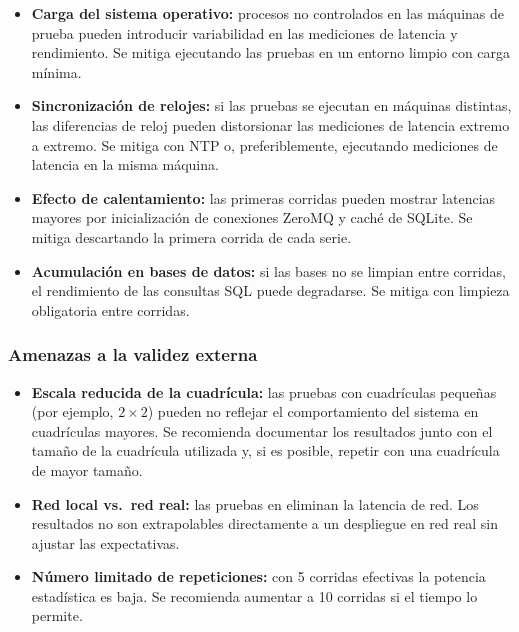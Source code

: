 \documentclass[12pt, a4paper]{article}
\let\oldtexttt\texttt
\renewcommand{\texttt}[1]{\oldtexttt{\seqsplit{#1}}}
\begin{document}
\begin{itemize}
    \item \textbf{Carga del sistema operativo:} procesos no controlados en las máquinas de prueba pueden introducir variabilidad en las mediciones de latencia y rendimiento. Se mitiga ejecutando las pruebas en un entorno limpio con carga mínima.
    \item \textbf{Sincronización de relojes:} si las pruebas se ejecutan en máquinas distintas, las diferencias de reloj pueden distorsionar las mediciones de latencia extremo a extremo. Se mitiga con NTP o, preferiblemente, ejecutando mediciones de latencia en la misma máquina.
    \item \textbf{Efecto de calentamiento:} las primeras corridas pueden mostrar latencias mayores por inicialización de conexiones ZeroMQ y caché de SQLite. Se mitiga descartando la primera corrida de cada serie.
    \item \textbf{Acumulación en bases de datos:} si las bases no se limpian entre corridas, el rendimiento de las consultas SQL puede degradarse. Se mitiga con limpieza obligatoria entre corridas.
\end{itemize}

\subsubsection{Amenazas a la validez externa}

\begin{itemize}
    \item \textbf{Escala reducida de la cuadrícula:} las pruebas con cuadrículas pequeñas (por ejemplo, $2\!\times\!2$) pueden no reflejar el comportamiento del sistema en cuadrículas mayores. Se recomienda documentar los resultados junto con el tamaño de la cuadrícula utilizada y, si es posible, repetir con una cuadrícula de mayor tamaño.
    \item \textbf{Red local vs.\ red real:} las pruebas en \texttt{localhost} eliminan la latencia de red. Los resultados no son extrapolables directamente a un despliegue en red real sin ajustar las expectativas.
    \item \textbf{Número limitado de repeticiones:} con 5 corridas efectivas la potencia estadística es baja. Se recomienda aumentar a 10 corridas si el tiempo lo permite.
\end{itemize}

\end{document}

